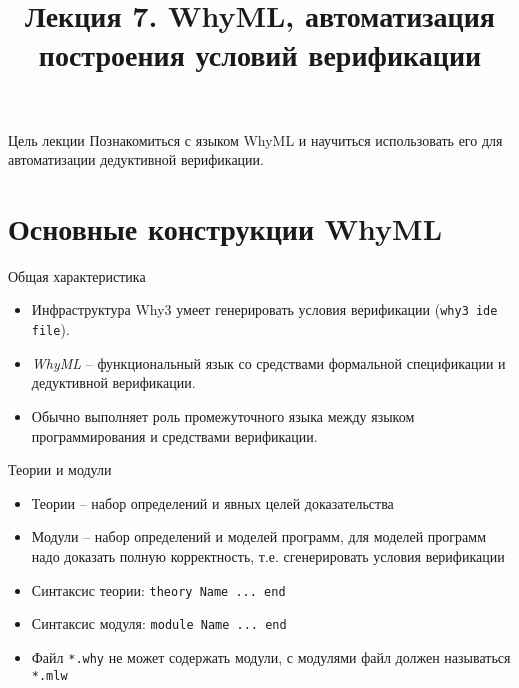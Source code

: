 \documentclass[hyperref={unicode=true}]{beamer}
\title{Лекция 7. WhyML, автоматизация построения условий верификации}
\author{}
\date{}
\begin{document}
	\begin{frame}{}
		\titlepage
	\end{frame}

    \begin{frame}{Цель лекции}
    Познакомиться с языком WhyML и
    научиться использовать его для
    автоматизации дедуктивной верификации.
    \end{frame}

    \section{Основные конструкции WhyML}

    \begin{frame}{Общая характеристика}
    \begin{itemize}
    \item
    Инфраструктура Why3 умеет генерировать
    условия верификации (\texttt{why3 ide file}).
    \item
    \textsl{WhyML} -- функциональный язык
    со средствами формальной спецификации и
    дедуктивной верификации.
    \item
    Обычно выполняет роль промежуточного языка
    между языком программирования и средствами
    верификации.
    \end{itemize}
    \end{frame}

    \begin{frame}{Теории и модули}
    \begin{itemize}
    \item
    Теории -- набор определений и явных целей доказательства
    \item
    Модули -- набор определений и моделей программ, для моделей программ надо
    доказать полную корректность, т.е. сгенерировать условия верификации
    \item
    Синтаксис теории: \texttt{theory Name ... end}
    \item
    Синтаксис модуля: \texttt{module Name ... end}
    \item
    Файл \texttt{*.why} не может содержать модули,
    с модулями файл должен называться \texttt{*.mlw}
    \end{itemize}
    \end{frame}
\end{document}

